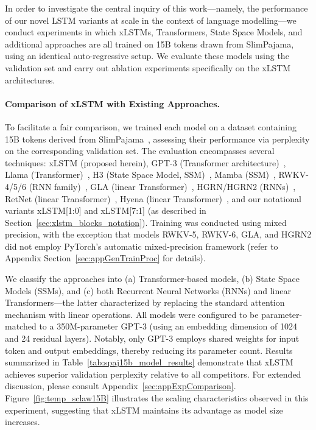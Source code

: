 In order to investigate the central inquiry of this work—namely, the performance of our novel LSTM variants at scale in the context of language modelling—we conduct experiments in which xLSTMs, Transformers, State Space Models, and additional approaches are all trained on 15B tokens drawn from SlimPajama, using an identical auto-regressive setup. We evaluate these models using the validation set and carry out ablation experiments specifically on the xLSTM architectures.

\paragraph{Comparison of xLSTM with Existing Approaches.} To facilitate a fair comparison, we trained each model on a dataset containing 15B tokens derived from SlimPajama~\citep{Soboleva:23}, assessing their performance via perplexity on the corresponding validation set. The evaluation encompasses several techniques: xLSTM (proposed herein), GPT-3 (Transformer architecture)~\citep{Brown:20short}, Llama (Transformer)~\citep{Touvron:23arxiv}, H3 (State Space Model, SSM)~\citep{Fu:23}, Mamba (SSM)~\citep{Gu:24arxiv}, RWKV-4/5/6 (RNN family)~\citep{Peng:23arxivshort,Peng:24arxivshort}, GLA (linear Transformer)~\citep{Yang:23arxiv}, HGRN/HGRN2 (RNNs)~\citep{Qin:23,Qin:24arxiv}, RetNet (linear Transformer)~\citep{Sun:23arxiv}, Hyena (linear Transformer)~\citep{Poli:23}, and our notational variants xLSTM[1:0] and xLSTM[7:1] (as described in Section~\ref{sec:xlstm_blocks_notation}). Training was conducted using mixed precision, with the exception that models RWKV-5, RWKV-6, GLA, and HGRN2 did not employ PyTorch's automatic mixed-precision framework (refer to Appendix Section~\ref{sec:appGenTrainProc} for details). 

We classify the approaches into (a) Transformer-based models, (b) State Space Models (SSMs), and (c) both Recurrent Neural Networks (RNNs) and linear Transformers—the latter characterized by replacing the standard attention mechanism with linear operations. All models were configured to be parameter-matched to a 350M-parameter GPT-3 (using an embedding dimension of 1024 and 24 residual layers). Notably, only GPT-3 employs shared weights for input token and output embeddings, thereby reducing its parameter count. Results summarized in Table~\ref{tab:spaj15b_model_results} demonstrate that xLSTM achieves superior validation perplexity relative to all competitors. For extended discussion, please consult Appendix~\ref{sec:appExpComparison}. Figure~\ref{fig:temp_sclaw15B} illustrates the scaling characteristics observed in this experiment, suggesting that xLSTM maintains its advantage as model size increases.

